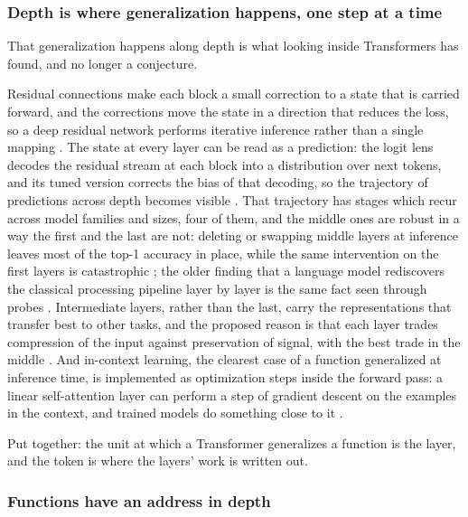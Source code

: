 \subsubsection{Depth is where generalization happens, one step at a time}
\label{sec:depth}

That generalization happens along depth is what looking inside Transformers has found, and no longer a conjecture.

Residual connections make each block a small correction to a state that is carried forward, and the
corrections move the state in a direction that reduces the loss, so a deep residual network performs
iterative inference rather than a single mapping \citep{jastrzebski2018}. The state at every layer can be
read as a prediction: the logit lens decodes the residual stream at each block into a distribution over
next tokens, and its tuned version corrects the bias of that decoding, so the trajectory of predictions
across depth becomes visible \citep{nostalgebraist2020,belrose2023}. That trajectory has stages which
recur across model families and sizes, four of them, and the middle ones are robust in a way the first
and the last are not: deleting or swapping middle layers at inference leaves most of the top-1 accuracy
in place, while the same intervention on the first layers is catastrophic \citep{lad2024}; the older finding that a language model rediscovers the classical processing pipeline
layer by layer is the same fact seen through probes \citep{tenney2019}. Intermediate layers, rather than
the last, carry the representations that transfer best to other tasks, and the proposed reason is that
each layer trades compression of the input against preservation of signal, with the best trade in the
middle \citep{skean2025}. And in-context learning, the clearest case of a function generalized at
inference time, is implemented as optimization steps inside the forward pass: a linear self-attention
layer can perform a step of gradient descent on the examples in the context, and trained models do
something close to it \citep{vonoswald2023}.

Put together: the unit at which a Transformer generalizes a function is the layer, and the token is where
the layers' work is written out.

\subsubsection{Functions have an address in depth}
\label{sec:address}

